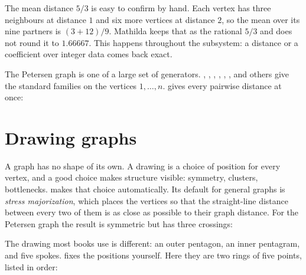 The mean distance \(5/3\) is easy to confirm by hand. Each vertex has three
neighbours at distance \(1\) and six more vertices at distance \(2\), so the
mean over its nine partners is \((3 + 12)/9\). Mathilda keeps that as the
rational \(5/3\) and does not round it to \(1.66667\). This happens throughout
the subsystem: a distance or a coefficient over integer data comes back exact.

The Petersen graph is one of a large set of generators. ,
, , , ,
, and others give the standard families on the vertices
\(1, \dots, n\).  gives every pairwise distance at once:

\begin{codepairs}
\end{codepairs}


\section{Drawing graphs}
\label{sec:graphs-drawing}

A graph has no shape of its own. A drawing is a choice of position for every
vertex, and a good choice makes structure visible: symmetry, clusters,
bottlenecks.  makes that choice automatically. Its default for
general graphs is \emph{stress majorization}, which places the vertices so that the straight-line distance
between every two of them is as close as possible to their graph distance.
For the Petersen graph the result is symmetric but has three crossings:


The drawing most books use is different: an outer pentagon, an inner pentagram,
and five spokes.  fixes the positions yourself. Here they
are two rings of five points, listed in  order:

